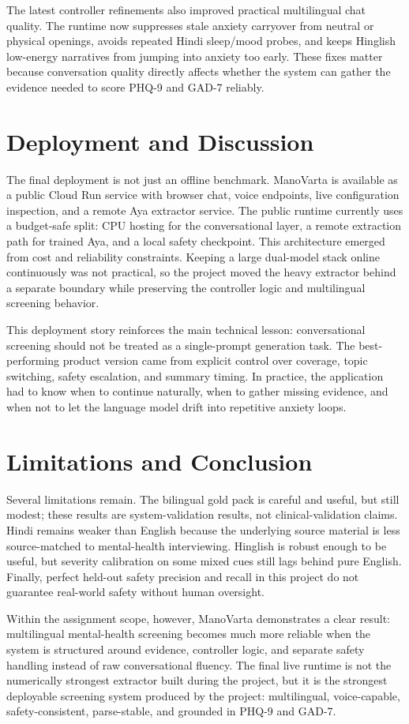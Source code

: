 \documentclass[11pt]{article}
\begin{document}
The latest controller refinements also improved practical multilingual chat quality. The runtime now suppresses stale anxiety carryover from neutral or physical openings, avoids repeated Hindi sleep/mood probes, and keeps Hinglish low-energy narratives from jumping into anxiety too early. These fixes matter because conversation quality directly affects whether the system can gather the evidence needed to score PHQ-9 and GAD-7 reliably.

\section{Deployment and Discussion}
The final deployment is not just an offline benchmark. ManoVarta is available as a public Cloud Run service with browser chat, voice endpoints, live configuration inspection, and a remote Aya extractor service. The public runtime currently uses a budget-safe split: CPU hosting for the conversational layer, a remote extraction path for trained Aya, and a local safety checkpoint. This architecture emerged from cost and reliability constraints. Keeping a large dual-model stack online continuously was not practical, so the project moved the heavy extractor behind a separate boundary while preserving the controller logic and multilingual screening behavior.

This deployment story reinforces the main technical lesson: conversational screening should not be treated as a single-prompt generation task. The best-performing product version came from explicit control over coverage, topic switching, safety escalation, and summary timing. In practice, the application had to know when to continue naturally, when to gather missing evidence, and when not to let the language model drift into repetitive anxiety loops.

\section{Limitations and Conclusion}
Several limitations remain. The bilingual gold pack is careful and useful, but still modest; these results are system-validation results, not clinical-validation claims. Hindi remains weaker than English because the underlying source material is less source-matched to mental-health interviewing. Hinglish is robust enough to be useful, but severity calibration on some mixed cues still lags behind pure English. Finally, perfect held-out safety precision and recall in this project do not guarantee real-world safety without human oversight.

Within the assignment scope, however, ManoVarta demonstrates a clear result: multilingual mental-health screening becomes much more reliable when the system is structured around evidence, controller logic, and separate safety handling instead of raw conversational fluency. The final live runtime is not the numerically strongest extractor built during the project, but it is the strongest deployable screening system produced by the project: multilingual, voice-capable, safety-consistent, parse-stable, and grounded in PHQ-9 and GAD-7.



\end{document}
